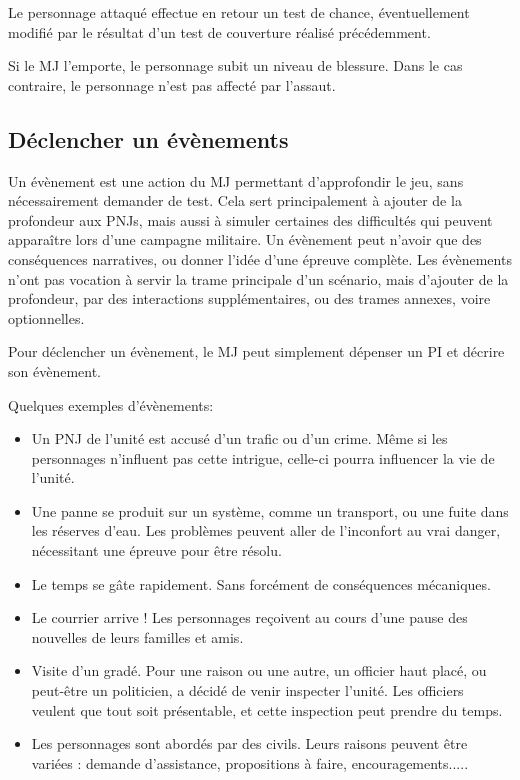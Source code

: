 \documentclass[twocolumn]{report}
\begin{document}
Le personnage attaqué effectue en retour un test de chance, éventuellement modifié par le résultat d'un test de couverture réalisé précédemment.

Si le MJ l'emporte, le personnage subit un niveau de blessure. Dans le cas contraire, le personnage n'est pas affecté par l'assaut.
\subsection{Déclencher un évènements}
Un évènement est une action du MJ permettant d'approfondir le jeu, sans nécessairement demander de test. Cela sert principalement à ajouter de la profondeur aux PNJs, mais aussi à simuler certaines des difficultés qui peuvent apparaître lors d'une campagne militaire. Un évènement peut n'avoir que des conséquences narratives, ou donner l'idée d'une épreuve complète. Les évènements n'ont pas vocation à servir la trame principale d'un scénario, mais d'ajouter de la profondeur, par des interactions supplémentaires, ou des trames annexes, voire optionnelles.

Pour déclencher un évènement, le MJ peut simplement dépenser un PI et décrire son évènement.

Quelques exemples d'évènements:
\begin{itemize}
    \item Un PNJ de l'unité est accusé d'un trafic ou d'un crime. Même si les personnages n'influent pas cette intrigue, celle-ci pourra influencer la vie de l'unité.
    \item Une panne se produit sur un système, comme un transport, ou une fuite dans les réserves d'eau. Les problèmes peuvent aller de l'inconfort au vrai danger, nécessitant une épreuve pour être résolu.
    \item Le temps se gâte rapidement. Sans forcément de conséquences mécaniques.
    \item Le courrier arrive ! Les personnages reçoivent au cours d'une pause des nouvelles de leurs familles et amis.
    \item Visite d'un gradé. Pour une raison ou une autre, un officier haut placé, ou peut-être un politicien, a décidé de venir inspecter l'unité. Les officiers veulent que tout soit présentable, et cette inspection peut prendre du temps.
    \item Les personnages sont abordés par des civils. Leurs raisons peuvent être variées : demande d'assistance, propositions à faire, encouragements.....
\end{itemize}
\end{document}
